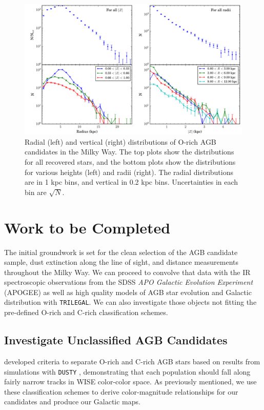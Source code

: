 \begin{figure}[h]
\centering
\includegraphics[width=6.5in]{figs/orich_radial_vertical_profile.pdf}
\caption{{\footnotesize Radial (left) and vertical (right) distributions of O-rich AGB candidates in the Milky Way. The top plots show the distributions for all recovered stars, and the bottom plots show the distributions for various heights (left) and radii (right). The radial distributions are in 1 kpc bins, and vertical in 0.2 kpc bins. Uncertainties in each bin are $\sqrt{N}$.}}
\label{fig:horvert_profile}
\end{figure}

\section{Work to be Completed}
The initial groundwork is set for the clean selection of the AGB candidate sample, dust extinction along the line of sight, and distance measurements throughout the Milky Way.  We can proceed to convolve that data with the IR spectroscopic observations from the SDSS \emph{APO Galactic Evolution Experiment} (APOGEE) as well as high quality models of AGB star evolution and Galactic distribution with {\tt TRILEGAL}. We can also investigate those objects not fitting the pre-defined O-rich and C-rich classification schemes.
\subsection{Investigate Unclassified AGB Candidates}
 \cite{2014MNRAS.442.3361N} developed criteria to separate O-rich and C-rich AGB stars based on results from simulations with {\tt DUSTY} \citep{1999astro.ph.10475I}, demonstrating that each population should fall along fairly narrow tracks in WISE color-color space. As previously mentioned, we use these classification schemes to derive color-magnitude relationships for our candidates and produce our Galactic maps. 
 
